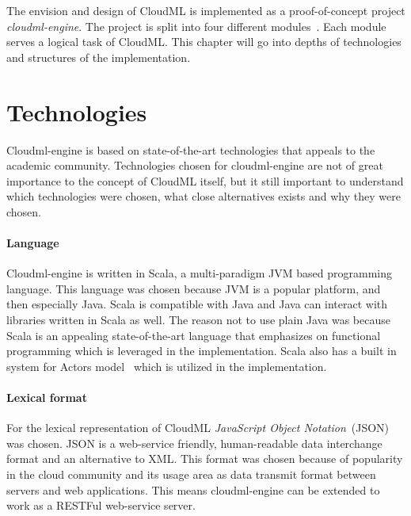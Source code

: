 




The envision and design of CloudML is implemented as a proof-of-concept project \emph{cloudml-engine}.
The project is split into four different modules~. 
Each module serves a logical task of CloudML.
This chapter will go into depths of technologies and structures of the implementation.

\section{Technologies}

Cloudml-engine is based on state-of-the-art technologies that appeals to the academic community.
Technologies chosen for cloudml-engine are not of great importance to the concept of CloudML itself,
but it still important to understand which technologies were chosen, what close alternatives exists
and why they were chosen.

\paragraph{Language} 
Cloudml-engine is written in Scala, a multi-paradigm JVM based programming language.
This language was chosen because JVM is a popular platform, and then especially Java.
Scala is compatible with Java and Java can interact with libraries written in Scala as well.
The reason not to use plain Java was because Scala is an appealing state-of-the-art language that emphasizes 
on functional programming which is leveraged in the implementation.
Scala also has a built in system for Actors model~\cite{actors:haller07} which is utilized in the implementation.

\paragraph{Lexical format}
For the lexical representation of CloudML \emph{JavaScript Object Notation}~(JSON) was chosen.
JSON is a web-service friendly, human-readable data interchange format and an alternative to XML.
This format was chosen because of popularity in the cloud community 
and its usage area as data transmit format between servers and web applications.
This means cloudml-engine can be extended to work as a RESTFul web-service server.

